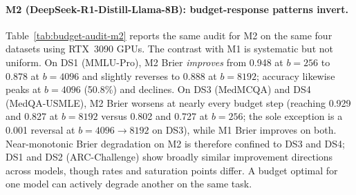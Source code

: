 \documentclass[a4paper,fleqn]{cas-sc}
\theoremstyle{plain}
\theoremstyle{definition}
\theoremstyle{remark}
\begin{document}
\paragraph{M2 (DeepSeek-R1-Distill-Llama-8B): budget-response patterns invert.}
Table~\ref{tab:budget-audit-m2} reports the same audit for M2 on the same four
datasets using RTX~3090 GPUs.
The contrast with M1 is systematic but not uniform.
On DS1 (MMLU-Pro), M2 Brier \emph{improves} from 0.948 at $b=256$ to 0.878
at $b=4096$ and slightly reverses to 0.888 at $b=8192$; accuracy likewise
peaks at $b=4096$ (50.8\%) and declines.
On DS3 (MedMCQA) and DS4 (MedQA-USMLE), M2 Brier worsens at nearly every
budget step (reaching 0.929 and 0.827 at $b=8192$ versus 0.802 and 0.727 at
$b=256$; the sole exception is a 0.001 reversal at $b=4096\!\to\!8192$ on DS3),
while M1 Brier improves on both.
Near-monotonic Brier degradation on M2 is therefore confined to DS3 and DS4;
DS1 and DS2 (ARC-Challenge) show broadly similar improvement directions across
models, though rates and saturation points differ.
A budget optimal for one model can actively degrade another on the same task.
\end{document}

